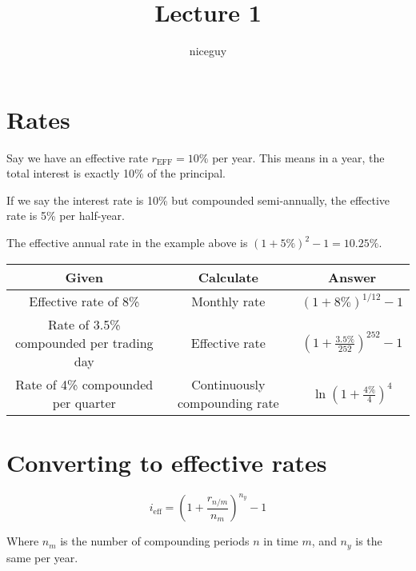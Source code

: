 \documentclass[12pt]{article}
\title{Lecture 1}
\author{niceguy}
\begin{document}
\maketitle

\section{Rates}

\begin{defn}
    Say we have an effective rate $r_{\text{EFF}} = 10\%$ per year. This means in a year, the total interest is exactly 10\% of the principal.
\end{defn}

\begin{defn}[Rate]
    If we say the interest rate is 10\% but compounded semi-annually, the effective rate is 5\% per half-year.
\end{defn}

\begin{rem}
    The effective annual rate in the example above is $(1 + 5\%)^2 - 1 = 10.25\%$.
\end{rem}

\begin{ex}
    \begin{tabular}{|c|c|c|}
        \hline
        Given & Calculate & Answer \\
        \hline\hline
        Effective rate of 8\% & Monthly rate & $(1+8\%)^{1/12} - 1$ \\
        \hline
        Rate of 3.5\% compounded per trading day & Effective rate & $\left(1+\frac{3.5\%}{252}\right)^{252} - 1$ \\
        \hline
        Rate of 4\% compounded per quarter & Continuously compounding rate & $\ln\left(1+\frac{4\%}{4}\right)^4$
        \hline
    \end{tabular}
\end{ex}

\section{Converting to effective rates}

\begin{equation}
    i_{\text{eff}} = \left(1 + \frac{r_{n/m}}{n_m}\right)^{n_y} - 1
\end{equation}

Where $n_m$ is the number of compounding periods $n$ in time $m$, and $n_y$ is the same per year.
\end{document}

